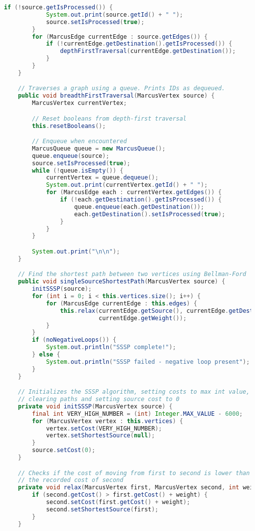 \documentclass[letterpaper, 10pt]{article}
\begin{document}
\begin{lstlisting}[language=Java, firstnumber=1]
        if (!source.getIsProcessed()) {
            System.out.print(source.getId() + " ");
            source.setIsProcessed(true);
        }
        for (MarcusEdge currentEdge : source.getEdges()) {
            if (!currentEdge.getDestination().getIsProcessed()) {
                depthFirstTraversal(currentEdge.getDestination());
            }
        }
    }

    // Traverses a graph using a queue. Prints IDs as dequeued.
    public void breadthFirstTraversal(MarcusVertex source) {
        MarcusVertex currentVertex;

        // Reset booleans from depth-first traversal
        this.resetBooleans();

        // Enqueue when encountered
        MarcusQueue queue = new MarcusQueue();
        queue.enqueue(source);
        source.setIsProcessed(true);
        while (!queue.isEmpty()) {
            currentVertex = queue.dequeue();
            System.out.print(currentVertex.getId() + " ");
            for (MarcusEdge each : currentVertex.getEdges()) {
                if (!each.getDestination().getIsProcessed()) {
                    queue.enqueue(each.getDestination());
                    each.getDestination().setIsProcessed(true);
                }
            }
        }

        System.out.print("\n\n");
    }

    // Find the shortest path between two vertices using Bellman-Ford
    public void singleSourceShortestPath(MarcusVertex source) {
        initSSSP(source);
        for (int i = 0; i < this.vertices.size(); i++) {
            for (MarcusEdge currentEdge : this.edges) {
                this.relax(currentEdge.getSource(), currentEdge.getDestination(),
                           currentEdge.getWeight());
            }
        }
        if (noNegativeLoops()) {
            System.out.println("SSSP complete!");
        } else {
            System.out.println("SSSP failed - negative loop present");
        }
    }   

    // Initializes the SSSP algorithm, setting costs to max int value,
    // clearing paths and setting source cost to 0
    private void initSSSP(MarcusVertex source) {
        final int VERY_HIGH_NUMBER = (int) Integer.MAX_VALUE - 6000;
        for (MarcusVertex vertex : this.vertices) {
            vertex.setCost(VERY_HIGH_NUMBER);
            vertex.setShortestSource(null);
        }
        source.setCost(0);
    }

    // Checks if the cost of moving from first to second is lower than
    // the recorded cost of second
    private void relax(MarcusVertex first, MarcusVertex second, int weight) {
        if (second.getCost() > first.getCost() + weight) {
            second.setCost(first.getCost() + weight);
            second.setShortestSource(first);
        }
    }


\end{lstlisting}
\end{document}
